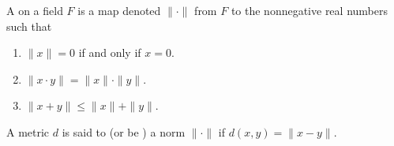 A  on a field $F$ is a map denoted $\|\cdot\|$ from $F$ to the nonnegative real numbers such that
\begin{enumerate}
\item $\|x\| = 0$ if and only if $x = 0$.
\item $\|x \cdot y\| = \|x\| \cdot \|y\|$.
\item $\|x + y\| \leq \|x\| + \|y\|$.
\end{enumerate}
A metric $d$ is said to  (or be ) a norm $\|\cdot\|$ if $d(x, y) = \|x - y\|$.
